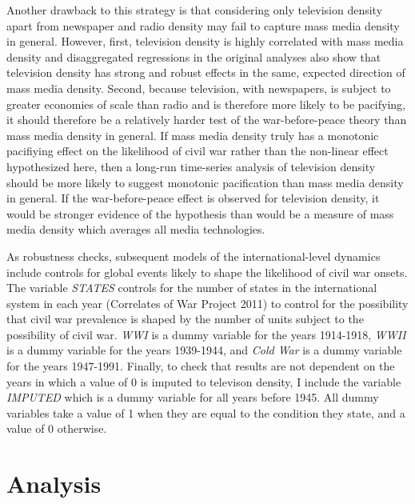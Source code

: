 \documentclass[11pt,article,oneside]{memoir}
\begin{document}
Another drawback to this strategy is that considering only television
density apart from newspaper and radio density may fail to capture mass
media density in general. However, first, television density is highly
correlated with mass media density and disaggregated regressions in the
original analyses also show that television density has strong and
robust effects in the same, expected direction of mass media density.
Second, because television, with newspapers, is subject to greater
economies of scale than radio and is therefore more likely to be
pacifying, it should therefore be a relatively harder test of the
war-before-peace theory than mass media density in general. If mass
media density truly has a monotonic pacifiying effect on the likelihood
of civil war rather than the non-linear effect hypothesized here, then a
long-run time-series analysis of television density should be more
likely to suggest monotonic pacification than mass media density in
general. If the war-before-peace effect is observed for television
density, it would be stronger evidence of the hypothesis than would be a
measure of mass media density which averages all media technologies.

As robustness checks, subsequent models of the international-level
dynamics include controls for global events likely to shape the
likelihood of civil war onsets. The variable \emph{STATES} controls for
the number of states in the international system in each year
(Correlates of War Project 2011) to control for the possibility that
civil war prevalence is shaped by the number of units subject to the
possibility of civil war. \emph{WWI} is a dummy variable for the years
1914-1918, \emph{WWII} is a dummy variable for the years 1939-1944, and
\emph{Cold War} is a dummy variable for the years 1947-1991. Finally, to
check that results are not dependent on the years in which a value of 0
is imputed to televison density, I include the variable \emph{IMPUTED}
which is a dummy variable for all years before 1945. All dummy variables
take a value of 1 when they are equal to the condition they state, and a
value of 0 otherwise.

\section{Analysis}\label{analysis}
\end{document}
